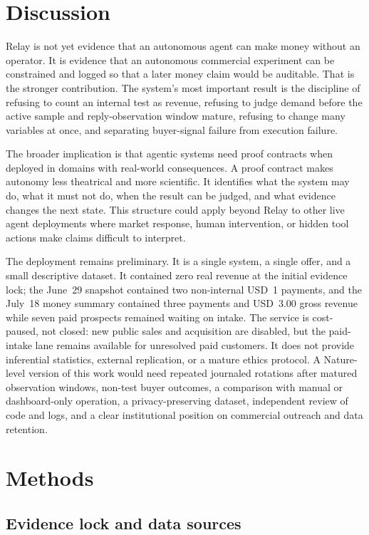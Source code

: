 \documentclass[12pt,letterpaper]{article}
\begin{document}
\section{Discussion}

Relay is not yet evidence that an autonomous agent can make money without an operator. It is evidence that an autonomous commercial experiment can be constrained and logged so that a later money claim would be auditable. That is the stronger contribution. The system's most important result is the discipline of refusing to count an internal test as revenue, refusing to judge demand before the active sample and reply-observation window mature, refusing to change many variables at once, and separating buyer-signal failure from execution failure.

The broader implication is that agentic systems need proof contracts when deployed in domains with real-world consequences. A proof contract makes autonomy less theatrical and more scientific. It identifies what the system may do, what it must not do, when the result can be judged, and what evidence changes the next state. This structure could apply beyond Relay to other live agent deployments where market response, human intervention, or hidden tool actions make claims difficult to interpret.

The deployment remains preliminary. It is a single system, a single offer, and a small descriptive dataset. It contained zero real revenue at the initial evidence lock; the June~29 snapshot contained two non-internal USD~1 payments, and the July~18 money summary contained three payments and USD~3.00 gross revenue while seven paid prospects remained waiting on intake. The service is cost-paused, not closed: new public sales and acquisition are disabled, but the paid-intake lane remains available for unresolved paid customers. It does not provide inferential statistics, external replication, or a mature ethics protocol. A Nature-level version of this work would need repeated journaled rotations after matured observation windows, non-test buyer outcomes, a comparison with manual or dashboard-only operation, a privacy-preserving dataset, independent review of code and logs, and a clear institutional position on commercial outreach and data retention.

\section{Methods}

\subsection{Evidence lock and data sources}
\end{document}
